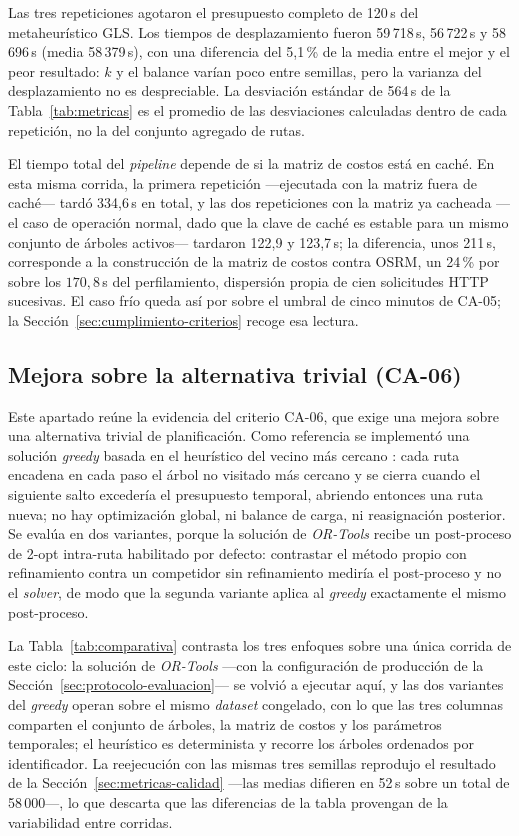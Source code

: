 Las tres repeticiones agotaron el presupuesto completo de 120\,s del metaheurístico GLS. Los
tiempos de desplazamiento fueron 59\,718\,s, 56\,722\,s y 58\,696\,s (media 58\,379\,s), con una
diferencia del 5{,}1\,\% de la media entre el mejor y el peor resultado: $k$ y el balance varían
poco entre semillas, pero la varianza del desplazamiento no es despreciable. La desviación estándar
de 564\,s de la Tabla~\ref{tab:metricas} es el promedio de las desviaciones calculadas dentro de
cada repetición, no la del conjunto agregado de rutas.

El tiempo total del \textit{pipeline} depende de si la matriz de costos está en caché. En esta
misma corrida, la primera repetición ---ejecutada con la matriz fuera de caché--- tardó 334{,}6\,s
en total, y las dos repeticiones con la matriz ya cacheada ---el caso de operación normal, dado que
la clave de caché es estable para un mismo conjunto de árboles activos--- tardaron 122{,}9 y
123{,}7\,s; la diferencia, unos 211\,s, corresponde a la construcción de la matriz de costos contra
OSRM, un 24\,\% por sobre los $170{,}8$\,s del perfilamiento, dispersión propia de cien solicitudes
HTTP sucesivas. El caso frío queda así por sobre el umbral de cinco minutos de CA-05; la
Sección~\ref{sec:cumplimiento-criterios} recoge esa lectura.

\subsection{Mejora sobre la alternativa trivial (CA-06)}
\label{sec:comparacion-greedy}

Este apartado reúne la evidencia del criterio CA-06, que exige una mejora sobre una alternativa
trivial de planificación. Como referencia se implementó una solución \textit{greedy} basada en el
heurístico del vecino más cercano \citep{rosenkrantz1977analysis}: cada ruta encadena en cada paso
el árbol no visitado más cercano y se cierra cuando el siguiente salto excedería el presupuesto
temporal, abriendo entonces una ruta nueva; no hay optimización global, ni balance de carga, ni
reasignación posterior. Se evalúa en dos variantes, porque la solución de \textit{OR-Tools} recibe
un post-proceso de 2-opt intra-ruta habilitado por defecto: contrastar el método propio con
refinamiento contra un competidor sin refinamiento mediría el post-proceso y no el \textit{solver},
de modo que la segunda variante aplica al \textit{greedy} exactamente el mismo post-proceso.

La Tabla~\ref{tab:comparativa} contrasta los tres enfoques sobre una única corrida de este ciclo:
la solución de \textit{OR-Tools} ---con la configuración de producción de la
Sección~\ref{sec:protocolo-evaluacion}--- se volvió a ejecutar aquí, y las dos variantes del
\textit{greedy} operan sobre el mismo \textit{dataset} congelado, con lo que las tres columnas
comparten el conjunto de árboles, la matriz de costos y los parámetros temporales; el heurístico es
determinista y recorre los árboles ordenados por identificador. La reejecución con las mismas tres
semillas reprodujo el resultado de la Sección~\ref{sec:metricas-calidad} ---las medias difieren en
52\,s sobre un total de 58\,000---, lo que descarta que las diferencias de la tabla provengan de la
variabilidad entre corridas.

